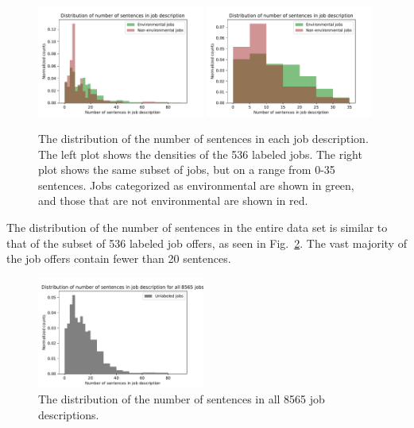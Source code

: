 \begin{figure}[htbp]
  \centering
    \includegraphics[width=0.49\textwidth]{figures/SentenceLength.pdf}
    \includegraphics[width=0.49\textwidth]{figures/SentenceLengthZoomed.pdf}

    \caption[The distribution of the number of sentences in each job description]{
    	The distribution of the number of sentences in each job description.
    	The left plot shows the densities of the 536 labeled jobs. The right plot shows the same subset of jobs, but on a range from 0-35 sentences. 
        Jobs categorized as environmental are shown in green, and those that are not environmental are shown in red.
    }
\label{fig:sentencelength}
\end{figure}


The distribution of the number of sentences in the entire data set is similar to that of the subset of 536 labeled job offers, as seen in Fig.~\ref{fig:sentencelengthall}. The vast majority of the job offers contain fewer than 20 sentences. 

\begin{figure}[htbp]
  \centering
    \includegraphics[width=0.49\textwidth]{figures/SentenceLengthAll.pdf}
    \caption{
    	The distribution of the number of sentences in all 8565 job descriptions.
    }
\label{fig:sentencelengthall}
\end{figure}



